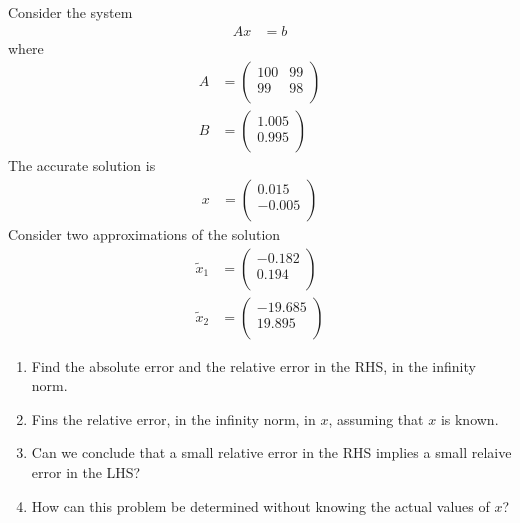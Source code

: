 \documentclass[fleqn, a4paper, 12pt, twoside]{article}
\theoremstyle{definition}
\theoremstyle{theorem}
\renewcommand{\tilde}{\widetilde}
\begin{document}
\begin{question}
	Consider the system
	\begin{align*}
		A x & = b
	\end{align*}
	where
	\begin{align*}
		A &=
			\begin{pmatrix}
				100 & 99 \\
				99  & 98 \\
			\end{pmatrix}\\
		B &=
			\begin{pmatrix}
				1.005 \\
				0.995 \\
			\end{pmatrix}
	\end{align*}
	The accurate solution is
	\begin{align*}
		x &=
			\begin{pmatrix}
				0.015  \\
				-0.005 \\
			\end{pmatrix}
	\end{align*}
	Consider two approximations of the solution
	\begin{align*}
		\tilde{x}_1 &=
			\begin{pmatrix}
				-0.182 \\
				0.194  \\
			\end{pmatrix}\\
		\tilde{x}_2 &=
			\begin{pmatrix}
				-19.685 \\
				19.895  \\
			\end{pmatrix}
	\end{align*}
	\begin{enumerate}
		\item Find the absolute error and the relative error in the RHS, in the infinity norm.
		\item Fins the relative error, in the infinity norm, in $x$, assuming that $x$ is known.
		\item Can we conclude that a small relative error in the RHS implies a small relaive error in the LHS?
		\item How can this problem be determined without knowing the actual values of $x$?
	\end{enumerate}
\end{question}
\end{document}

